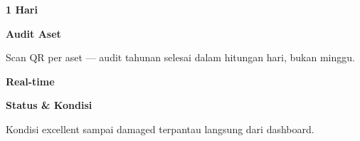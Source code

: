 \documentclass[a4paper]{article}
\begin{document}
\begin{minipage}[t]{0.485\textwidth}
    \noindent\colorbox{BlueBg}{%
        \begin{minipage}[t][2.7cm][c]{\dimexpr\linewidth-2\fboxsep\relax}
            \centering
            {\fontsize{20}{24}\selectfont\bfseries\color{BluePrimary} 1 Hari}\par\vspace{2pt}
            {\fontsize{9.5}{12}\selectfont\bfseries\color{BlueDark} Audit Aset}\par\vspace{2pt}
            {\fontsize{8.5}{11}\selectfont\color{TextDark}Scan QR per aset --- audit tahunan selesai dalam hitungan hari, bukan minggu.}
        \end{minipage}}\par
    \vspace{6pt}
    \noindent\colorbox{BlueBg}{%
        \begin{minipage}[t][2.7cm][c]{\dimexpr\linewidth-2\fboxsep\relax}
            \centering
            {\fontsize{20}{24}\selectfont\bfseries\color{BluePrimary} Real-time}\par\vspace{2pt}
            {\fontsize{9.5}{12}\selectfont\bfseries\color{BlueDark} Status \& Kondisi}\par\vspace{2pt}
            {\fontsize{8.5}{11}\selectfont\color{TextDark}Kondisi excellent sampai damaged terpantau langsung dari dashboard.}
        \end{minipage}}%
\end{minipage}

\vspace{8pt}
\end{document}
